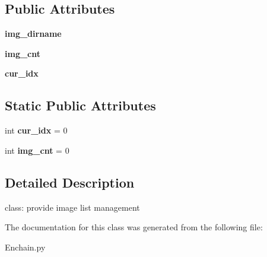 \subsection*{Public Attributes}
\begin{DoxyCompactItemize}
\item 
{\bfseries img\+\_\+dirname}\hypertarget{classEnchain_1_1ImgList_ad465be8e484cb5d7690d3c25ef619350}{}\label{classEnchain_1_1ImgList_ad465be8e484cb5d7690d3c25ef619350}

\item 
{\bfseries img\+\_\+cnt}\hypertarget{classEnchain_1_1ImgList_ae02ad449877d9c92ecb0477c70c2c915}{}\label{classEnchain_1_1ImgList_ae02ad449877d9c92ecb0477c70c2c915}

\item 
{\bfseries cur\+\_\+idx}\hypertarget{classEnchain_1_1ImgList_a3fc42ff6a5b94e104e0d234b56a92b3f}{}\label{classEnchain_1_1ImgList_a3fc42ff6a5b94e104e0d234b56a92b3f}

\end{DoxyCompactItemize}
\subsection*{Static Public Attributes}
\begin{DoxyCompactItemize}
\item 
int {\bfseries cur\+\_\+idx} = 0\hypertarget{classEnchain_1_1ImgList_a6598597dce46ff6a28c66f0d774b66fb}{}\label{classEnchain_1_1ImgList_a6598597dce46ff6a28c66f0d774b66fb}

\item 
int {\bfseries img\+\_\+cnt} = 0\hypertarget{classEnchain_1_1ImgList_a762bd9dd47d42bf2a8d83bd4a118d8b7}{}\label{classEnchain_1_1ImgList_a762bd9dd47d42bf2a8d83bd4a118d8b7}

\end{DoxyCompactItemize}


\subsection{Detailed Description}
\begin{DoxyVerb}class: provide image list management
\end{DoxyVerb}
 

The documentation for this class was generated from the following file\+:\begin{DoxyCompactItemize}
\item 
Enchain.\+py\end{DoxyCompactItemize}
